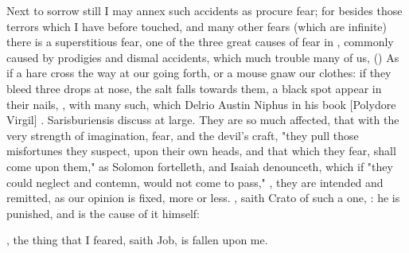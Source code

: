 Next to sorrow still I may annex such accidents as procure fear; for besides
those terrors which I have before touched, and many other
fears (which are infinite) there is a superstitious fear, one of the three
great causes of fear in \Aristotle{}, commonly caused by prodigies and dismal
accidents, which much trouble many of us, () As if a hare cross the way at our going forth, or a mouse
gnaw our clothes: if they bleed three drops at nose, the salt falls towards
them, a black spot appear in their nails, \etc{}, with many such, which Delrio
 Austin Niphus in his book
 [Polydore Virgil]
. Sarisburiensis
 discuss at large. They are so
much affected, that with the very strength of imagination, fear, and the
devil's craft, "they pull those misfortunes they suspect,
upon their own heads, and that which they fear, shall come upon them," as
Solomon fortelleth,  and Isaiah denounceth,
 which if "they could neglect and
contemn, would not come to pass," , they are intended and remitted, as our
opinion is fixed, more or less. , saith
Crato of such a one, : he is
punished, and is the cause of it himself:

, the thing that I feared, saith
Job, is fallen upon me.

